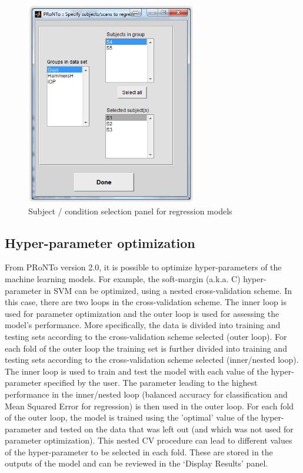 \begin{figure}[!h]
\begin{center}
\includegraphics[height=3.5in]{images/prt_ui_model_regression.PNG}
\caption{Subject / condition selection panel for regression models}
 \label{fig_specify_classesR}
\end{center}
\end{figure}

\subsection{Hyper-parameter optimization}

From PRoNTo version 2.0, it is possible to optimize hyper-parameters of the machine learning models. For example, the soft-margin (a.k.a. C) hyper-parameter in
SVM can be optimized, using a nested cross-validation scheme. In this case, there are two loops in the cross-validation scheme. The inner loop is used for parameter optimization and the outer loop is used for assessing the model's performance. More specifically, the data is divided into training and testing sets according to the cross-validation scheme selected (outer loop). For each fold of the outer loop the training set is further divided into training and testing sets according to the cross-validation scheme selected (inner/nested loop). The inner loop is used to train and test the model with each value of the hyper-parameter specified by the user. The parameter leading to the highest performance in the inner/nested loop (balanced accuracy for classification and Mean Squared Error for regression) is then used in the outer loop. For each fold of the outer loop, the model is trained using the 'optimal' value of the hyper-parameter and tested on the data that was left out (and which was not used for parameter optimization). This nested CV procedure can lead to different values of the hyper-parameter to be selected in each fold. These are stored in the outputs of the model and can be reviewed in the `Display Results' panel.

